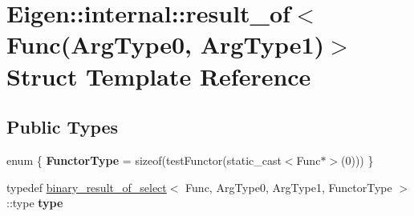 \hypertarget{struct_eigen_1_1internal_1_1result__of_3_01_func_07_arg_type0_00_01_arg_type1_08_4}{}\section{Eigen\+::internal\+::result\+\_\+of$<$ Func(Arg\+Type0, Arg\+Type1)$>$ Struct Template Reference}
\label{struct_eigen_1_1internal_1_1result__of_3_01_func_07_arg_type0_00_01_arg_type1_08_4}
\subsection*{Public Types}
\begin{DoxyCompactItemize}
\item 
\mbox{\label{struct_eigen_1_1internal_1_1result__of_3_01_func_07_arg_type0_00_01_arg_type1_08_4_aeaad85f987e143201614fb817f372fe0}} 
enum \{ {\bfseries Functor\+Type} = sizeof(test\+Functor(static\+\_\+cast$<$Func$\ast$$>$(0)))
 \}
\item 
\mbox{\label{struct_eigen_1_1internal_1_1result__of_3_01_func_07_arg_type0_00_01_arg_type1_08_4_a9fc9de324fc8a6bbd2e9907ab2bcea49}} 
typedef \mbox{\hyperlink{struct_eigen_1_1internal_1_1binary__result__of__select}{binary\+\_\+result\+\_\+of\+\_\+select}}$<$ Func, Arg\+Type0, Arg\+Type1, Functor\+Type $>$\+::type {\bfseries type}
\end{DoxyCompactItemize}
